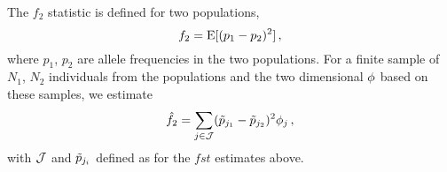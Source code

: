 The $f_2$ statistic \cite{Reich2009, Peter2016} is defined for two populations,
%
\begin{equation}\label{eq:f2}
    f_2 = \text{E}[(p_1 - p_2)^2] 
    \, ,
\end{equation}
%
where $p_1$, $p_2$ are allele frequencies in the two populations.
For a finite sample of $N_1$, $N_2$ individuals from the populations and the two dimensional $\phi$ based on these samples, we estimate
%
\begin{equation}\label{eq:sfsf2}
    \hat{f_2}
    = 
    \sum_{j \in \mathcal{J}} 
    (\tilde{p}_{j_{1}} - \tilde{p}_{j_{2}})^2 \phi_j
    \, ,
\end{equation}
%
with $\mathcal{J}$ and $\tilde{p}_{j_{i}}$ defined as for the $fst$ estimates above.

\printbibliography
